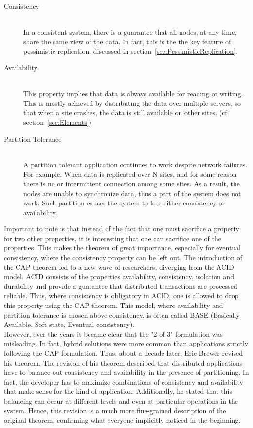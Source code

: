\documentclass[a4paper,12pt]{report}
\begin{document}
\begin{description}
    \item[Consistency] \hfill \\In a consistent system, there is a guarantee that all nodes, at any time, share the same view of the data. In fact, this is the the key feature of pessimistic replication, discussed in section~\ref{sec:PessimisticReplication}.
    \item[Availability] \hfill \\This property implies that data is always available for reading or writing. This is mostly achieved by distributing the data over multiple servers, so that when a site crashes, the data is still available on other sites. (cf. section~\ref{sec:Elements})
    \item[Partition Tolerance] \hfill \\A partition tolerant application continues to work despite network failures. For example, When data is replicated over N sites, and for some reason there is no or intermittent connection among some sites. As a result, the nodes are unable to synchronize data, thus a part of the system does not work. Such partition causes the system to lose either consistency or availability.
\end{description}

Important to note is that instead of the fact that one must sacrifice a property for two other properties, it is interesting that one can sacrifice one of the properties. This makes the theorem of great importance, especially for eventual consistency, where the consistency property can be left out. The introduction of the CAP theorem led to a new wave of researchers, diverging from the ACID model. ACID consists of the properties availability, consistency, isolation and durability and provide a guarantee that distributed transactions are processed reliable. Thus, where consistency is obligatory in ACID, one is allowed to drop this property using the CAP theorem. This model, where availability and partition tolerance is chosen above consistency, is often called BASE (Basically Available, Soft state, Eventual consistency). \\
However, over the years it became clear that the "2 of 3" formulation was misleading. In fact, hybrid solutions were more common than applications strictly following the CAP formulation. Thus, about a decade later, Eric Brewer revised his theorem. The revision of his theorem described that distributed applications have to balance out consistency and availability in the presence of partitioning. In fact, the developer has to maximize combinations of consistency and availability that make sense for the kind of application. Additionally, he stated that this balancing can occur at different levels and even at particular operations in the system. Hence, this revision is a much more fine-grained description of the original theorem, confirming what everyone implicitly noticed in the beginning. 
\end{document}
